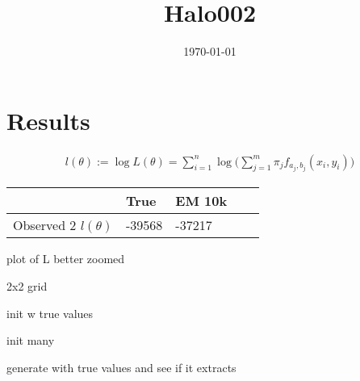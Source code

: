 \documentclass[12pt]{amsart}
\title{Halo002}
\author{\today}
\newcommand{\eqn}[1]{\begin{align*}
#1
\end{align*}}
\begin{document}
\maketitle



















\section{Results}


\eqn{
	l(\theta) := \log L(\theta) = \sum_{i=1}^{n} \log \Big( \sum_{j=1}^{m} \pi_j f_{a_j,b_j}(x_i,y_i) \Big)
}


\begin{table}[h]
	\begin{center}
		\begin{tabular}{l| l l l l}
			& 				True		& EM 10k	\\
		 \hline
		 Observed 2 $l(\theta)$	&	-39568	& -37217	\\
		\end{tabular}
	\end{center}
\end{table}





plot of L better zoomed

2x2 grid

init w true values

init many

generate with true values and see if it extracts
\end{document}
